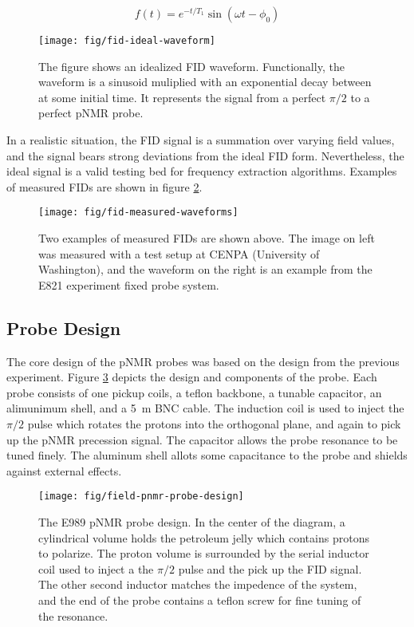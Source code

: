 \begin{equation}
f(t) = e^{-t/T_1} \sin(\omega t - \phi_0)
\label{eqn:ideal-fid}
\end{equation}

\begin{figure}
\label{fig:fid-ideal-waveform}
\centering
\texttt{[image: fig/fid-ideal-waveform]}
\caption{The figure shows an idealized FID waveform. Functionally, the waveform is a sinusoid muliplied with an exponential decay between at some initial time.  It represents the signal from a perfect $\pi/2$ to a perfect pNMR probe.}
\end{figure}

In a realistic situation, the FID signal is a summation over varying field values, and the signal bears strong deviations from the ideal FID form.  Nevertheless, the ideal signal is a valid testing bed for frequency extraction algorithms.  Examples of measured FIDs are shown in figure \ref{fig:fid-measured-waveforms}.

\begin{figure}
\label{fig:fid-measured-waveforms}
\centering
\texttt{[image: fig/fid-measured-waveforms]}
\caption{Two examples of measured FIDs are shown above. The image on left was measured with a test setup at CENPA (University of Washington), and the waveform on the right is an example from the E821 experiment fixed probe system.}
\end{figure}

\subsection{Probe Design}

The core design of the pNMR probes was based on the design from the previous experiment. Figure \ref{fig:field-pnmr-probe-design} depicts the design and components of the probe.  Each probe consists of one pickup coils, a teflon backbone, a tunable capacitor, an alimunimum shell, and a \SI{5}{\meter} BNC cable.  The induction coil is used to inject the $\pi/2$ pulse which rotates the protons into the orthogonal plane, and again to pick up the pNMR precession signal.  The capacitor allows the probe resonance to be tuned finely.  The aluminum shell allots some capacitance to the probe and shields against external effects.

\begin{figure}
\label{fig:field-pnmr-probe-design}
\texttt{[image: fig/field-pnmr-probe-design]}
\caption{The E989 pNMR probe design.  In the center of the diagram, a cylindrical volume holds the petroleum jelly which contains protons to polarize.  The proton volume is surrounded by the serial inductor coil used to inject a the $\pi/2$ pulse and the pick up the FID signal.  The other second inductor matches the impedence of the system, and the end of the probe contains a teflon screw for fine tuning of the resonance.}
\end{figure}

